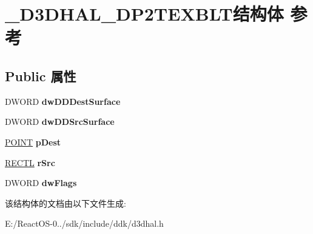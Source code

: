\hypertarget{struct___d3_d_h_a_l___d_p2_t_e_x_b_l_t}{}\section{\+\_\+\+D3\+D\+H\+A\+L\+\_\+\+D\+P2\+T\+E\+X\+B\+L\+T结构体 参考}
\label{struct___d3_d_h_a_l___d_p2_t_e_x_b_l_t}
\subsection*{Public 属性}
\begin{DoxyCompactItemize}
\item 
\mbox{\label{struct___d3_d_h_a_l___d_p2_t_e_x_b_l_t_a1907bf3b09ebf256db9fcbfdcf5dd8f5}} 
D\+W\+O\+RD {\bfseries dw\+D\+D\+Dest\+Surface}
\item 
\mbox{\label{struct___d3_d_h_a_l___d_p2_t_e_x_b_l_t_a5aa0fd57f1a112e158ee793272eab451}} 
D\+W\+O\+RD {\bfseries dw\+D\+D\+Src\+Surface}
\item 
\mbox{\label{struct___d3_d_h_a_l___d_p2_t_e_x_b_l_t_a49055df9bda4089c6307ee79d71d3706}} 
\hyperlink{structtag_p_o_i_n_t}{P\+O\+I\+NT} {\bfseries p\+Dest}
\item 
\mbox{\label{struct___d3_d_h_a_l___d_p2_t_e_x_b_l_t_aa1b45490677be12efe25f009709f7d9f}} 
\hyperlink{struct___r_e_c_t_l}{R\+E\+C\+TL} {\bfseries r\+Src}
\item 
\mbox{\label{struct___d3_d_h_a_l___d_p2_t_e_x_b_l_t_a3eb49c6f8ff107861c6ef8ffcfdad5f4}} 
D\+W\+O\+RD {\bfseries dw\+Flags}
\end{DoxyCompactItemize}


该结构体的文档由以下文件生成\+:\begin{DoxyCompactItemize}
\item 
E\+:/\+React\+O\+S-\/0../sdk/include/ddk/d3dhal.\+h\end{DoxyCompactItemize}
